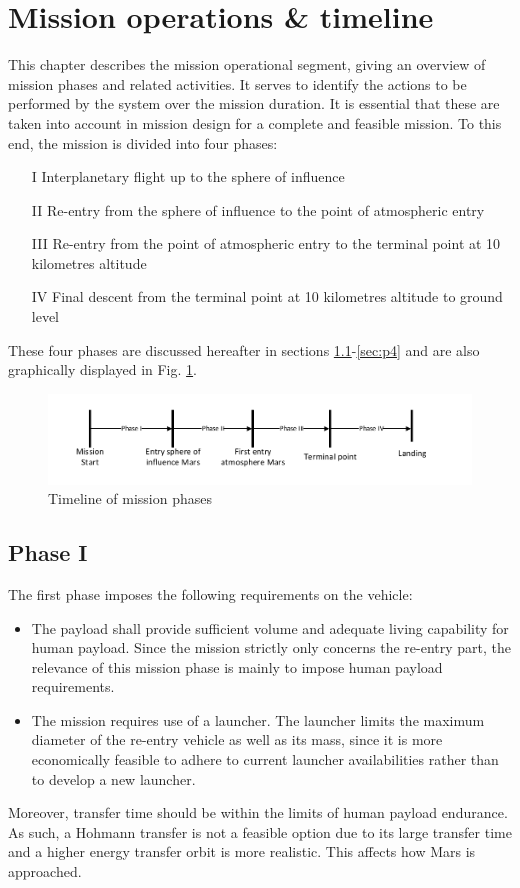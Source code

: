 \section{Mission operations \& timeline}\label{cha:opseg}
This chapter describes the mission operational segment, giving an overview of mission phases and related activities. It serves to identify the actions to be performed by the system over the mission duration. It is essential that these are taken into account in mission design for a complete and feasible mission. To this end, the mission is divided into four phases: 
\begin{itemize}
\item[I]{Interplanetary flight up to the sphere of influence}
\item[II]{Re-entry from the sphere of influence to the point of atmospheric entry}
\item[III]{Re-entry from the point of atmospheric entry to the terminal point at 10 kilometres altitude}
\item[IV]{Final descent from the terminal point at 10 kilometres altitude to ground level}
\end{itemize}
These four phases are discussed hereafter in sections \ref{sec:p1}-\ref{sec:p4} and are also graphically displayed in Fig. \ref{fig:time}.

\begin{figure}[H]
\centering
\includegraphics[width = 1.0\textwidth]{Figure/OPS.pdf}
\caption{Timeline of mission phases}
\label{fig:time}
\end{figure}

\subsection{Phase I}\label{sec:p1}
The first phase imposes the following requirements on the vehicle:
\begin{itemize}
\item The payload shall provide sufficient volume and adequate living capability for human payload. Since the mission strictly only concerns the re-entry part, the relevance of this mission phase is mainly to impose human payload requirements. 
\item  The mission requires use of a launcher. The launcher limits the maximum diameter of the re-entry vehicle as well as its mass, since it is more economically feasible to adhere to current launcher availabilities rather than to develop a new launcher.
\end{itemize}
Moreover, transfer time should be within the limits of human payload endurance. As such, a Hohmann transfer is not a feasible option due to its large transfer time and a higher energy transfer orbit is more realistic. This affects how Mars is approached.

